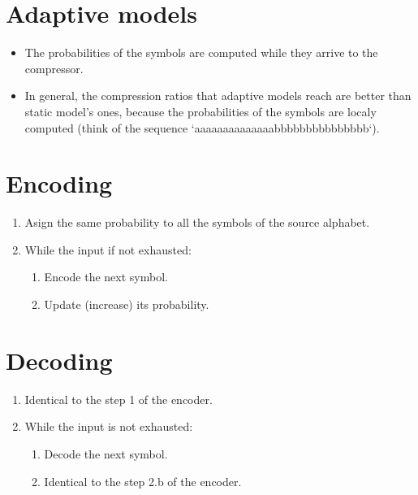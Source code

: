 \section{Adaptive models}
\begin{itemize}
\item The probabilities of the symbols are computed while they arrive to the compressor.
\item In general, the compression ratios that adaptive models reach are better than static model's ones, because the
  probabilities of the symbols are localy computed (think of the sequence `aaaaaaaaaaaaaabbbbbbbbbbbbbbb`).
\end{itemize}

\section{Encoding}
\begin{enumerate}
\item Asign the same probability to all the symbols of the source alphabet.
\item While the input if not exhausted:
  \begin{enumerate}
  \item Encode the next symbol.
  \item Update (increase) its probability.
  \end{enumerate}
\end{enumerate}

\section{Decoding}
\begin{enumerate}
\item Identical to the step 1 of the encoder.
\item While the input is not exhausted:
  \begin{enumerate}
  \item Decode the next symbol.
  \item Identical to the step 2.b of the encoder.
  \end{enumerate}
\end{enumerate}

